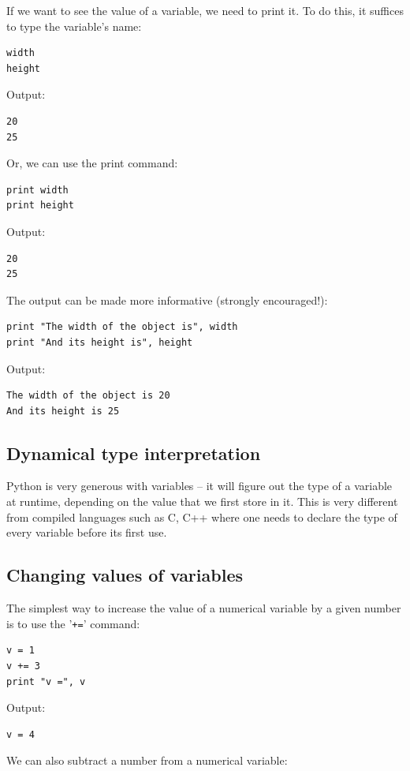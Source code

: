 \documentclass[article,A4,12pt]{llncs}
\begin{document}
If we want to see the value of a variable, we need to print it.
To do this, it suffices to type the variable's name:

\begin{verbatim}
width
height
\end{verbatim}
Output:

\begin{verbatim}
20
25
\end{verbatim}
Or, we can use the print command:

\begin{verbatim}
print width
print height
\end{verbatim}
Output:

\begin{verbatim}
20
25
\end{verbatim}
The output can be made more informative (strongly encouraged!):

\begin{verbatim}
print "The width of the object is", width
print "And its height is", height
\end{verbatim}
Output:

\begin{verbatim}
The width of the object is 20
And its height is 25
\end{verbatim}

\subsection{Dynamical type interpretation}

Python is very generous with variables -- it will figure out the type of a variable 
at runtime, depending on the value that we first store in it. This is very different 
from compiled languages such as C, C++ where one needs to declare the type of every variable 
before its first use. 

\subsection{Changing values of variables}

The simplest way to increase the value of a numerical variable by a given number is to use the '{\tt +=}' 
command:

\begin{verbatim}
v = 1
v += 3
print "v =", v
\end{verbatim}
Output:

\begin{verbatim}
v = 4
\end{verbatim}
We can also subtract a number from a numerical variable:
\end{document}
